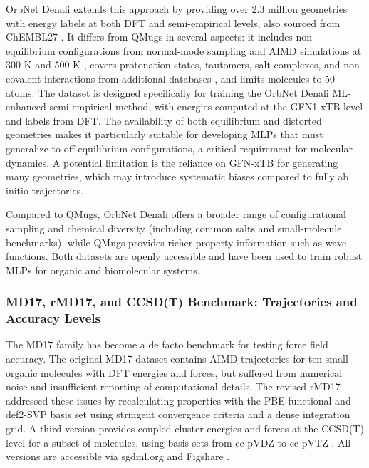 \documentclass[12pt]{article}
\begin{document}
OrbNet Denali \cite{ds19-25} extends this approach by providing over 2.3 million geometries with energy labels at both DFT and semi-empirical levels, also sourced from ChEMBL27 \cite{ds19-115,ds19-25}. It differs from QMugs in several aspects: it includes non-equilibrium configurations from normal-mode sampling and AIMD simulations at 300 K and 500 K \cite{ds19-7,ds19-112}, covers protonation states, tautomers, salt complexes, and non-covalent interactions from additional databases \cite{ds19-116,ds19-117,ds19-118}, and limits molecules to 50 atoms. The dataset is designed specifically for training the OrbNet Denali ML-enhanced semi-empirical method, with energies computed at the GFN1-xTB level \cite{ds19-112} and labels from DFT. The availability of both equilibrium and distorted geometries makes it particularly suitable for developing MLPs that must generalize to off-equilibrium configurations, a critical requirement for molecular dynamics. A potential limitation is the reliance on GFN-xTB for generating many geometries, which may introduce systematic biases compared to fully ab initio trajectories.

Compared to QMugs, OrbNet Denali offers a broader range of configurational sampling and chemical diversity (including common salts and small-molecule benchmarks), while QMugs provides richer property information such as wave functions. Both datasets are openly accessible \cite{ds18-114,ds19-119} and have been used to train robust MLPs for organic and biomolecular systems.

\subsubsection*{MD17, rMD17, and CCSD(T) Benchmark: Trajectories and Accuracy Levels}

The MD17 family \cite{ds20-18,ds20-19,ds20-20} has become a de facto benchmark for testing force field accuracy. The original MD17 dataset contains AIMD trajectories for ten small organic molecules with DFT energies and forces, but suffered from numerical noise and insufficient reporting of computational details. The revised rMD17 \cite{ds20-19} addressed these issues by recalculating properties with the PBE functional and def2-SVP basis set \cite{ds20-92,ds20-120} using stringent convergence criteria and a dense integration grid. A third version \cite{ds20-20} provides coupled-cluster energies and forces at the CCSD(T) level for a subset of molecules, using basis sets from cc-pVDZ to cc-pVTZ \cite{ds20-99}. All versions are accessible via sgdml.org and Figshare \cite{ds20-121,ds20-122}.
\end{document}
